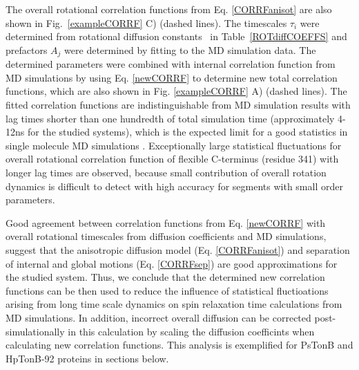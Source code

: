 \documentclass[pre,aps,floatfix,authordate1-4,twocolumn]{revtex4-1}
\begin{document}
The overall rotational correlation functions from Eq. \ref{CORRFanisot}
are also shown in Fig.~\ref{exampleCORRF} C) (dashed lines). 
The timescales $\tau_i$ were determined from rotational diffusion constants~\cite{Note1}
in Table~\ref{ROTdiffCOEFFS} and prefactors $A_j$ were determined by
fitting to the MD simulation data. The determined parameters were
combined with internal correlation function from MD simulations by using Eq. \ref{newCORRF}
to determine new total correlation functions, which are also shown 
in Fig. \ref{exampleCORRF} A) (dashed lines). The fitted correlation functions
are indistinguishable from MD simulation results with lag times shorter than
one hundredth of total simulation time (approximately 4-12ns for the studied systems),
which is the expected limit for a good statistics in single molecule MD simulations \cite{lu06}.
Exceptionally large statistical fluctuations for overall rotational correlation
function of flexible C-terminus (residue 341) with longer lag times are observed,
because small contribution of overall rotation dynamics is difficult
to detect with high accuracy for segments with small order parameters.

Good agreement between correlation functions from Eq. \ref{newCORRF}
with overall rotational timescales from diffusion
coefficients and MD simulations, suggest 
that the anisotropic diffusion model (Eq. \ref{CORRFanisot}) and
separation of internal and global motions (Eq. \ref{CORRFsep}) are
good approximations for the studied system. Thus, we conclude that
the determined new correlation functions can be then used to
reduce the influence of statistical fluctioations arising from long
time scale dynamics on spin relaxation time calculations from MD
simulations. In addition, incorrect overall diffusion can be corrected
post-simulationally in this calculation by scaling the diffusion
coefficints when calculating new correlation functions.
This analysis is exemplified for PsTonB and HpTonB-92 proteins in
sections below.


\end{document}
